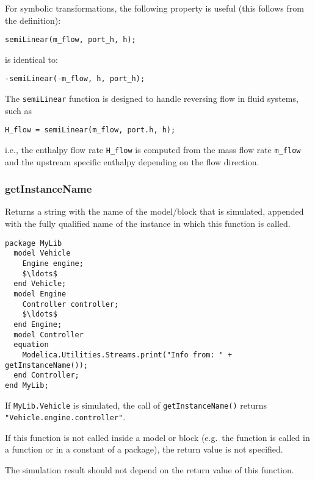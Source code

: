 \begin{nonnormative}
For symbolic transformations, the following property is useful (this follows from the definition):
\begin{lstlisting}[language=modelica]
semiLinear(m_flow, port_h, h);
\end{lstlisting}
is identical to:
\begin{lstlisting}[language=modelica]
-semiLinear(-m_flow, h, port_h);
\end{lstlisting}

The \lstinline!semiLinear! function is designed to handle reversing flow in fluid systems, such as
\begin{lstlisting}[language=modelica]
H_flow = semiLinear(m_flow, port.h, h);
\end{lstlisting}
i.e., the enthalpy flow rate \lstinline!H_flow! is computed from the mass flow rate \lstinline!m_flow! and the upstream specific enthalpy depending on the flow direction.
\end{nonnormative}

\subsubsection{getInstanceName}\label{getinstancename}

Returns a string with the name of the model/block that is simulated, appended with the fully qualified name of the instance in which this function is called.

\begin{example}
\begin{lstlisting}[language=modelica]
package MyLib
  model Vehicle
    Engine engine;
    $\ldots$
  end Vehicle;
  model Engine
    Controller controller;
    $\ldots$
  end Engine;
  model Controller
  equation
    Modelica.Utilities.Streams.print("Info from: " + getInstanceName());
  end Controller;
end MyLib;
\end{lstlisting}
If \lstinline!MyLib.Vehicle! is simulated, the call of \lstinline!getInstanceName()! returns \lstinline!"Vehicle.engine.controller"!.
\end{example}

If this function is not called inside a model or block (e.g.\ the function is called in a function or in a constant of a package), the return value is not specified.

\begin{nonnormative}
The simulation result should not depend on the return value of this function.
\end{nonnormative}

